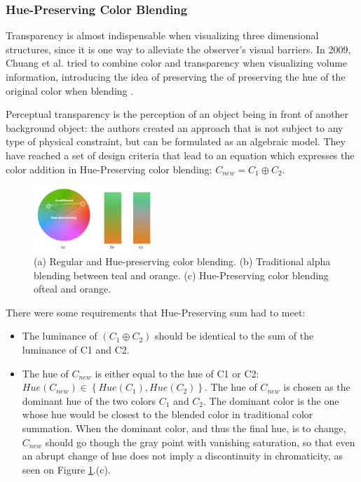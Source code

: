 \subsubsection{Hue-Preserving Color Blending}
%
Transparency is almost indispensable when visualizing three dimensional structures, since it is one way to
alleviate the observer’s visual barriers.
In 2009, Chuang et al. tried to combine color and transparency when visualizing volume information,
introducing the idea of preserving the of preserving the hue of the original color when blending \cite{Chuang2009}. \par
Perceptual transparency is the perception of an object being in front of another
background object: the authors created an approach that is not subject to any type of physical constraint, but can be
formulated as an algebraic model. They have reached a set of design criteria that lead
to an equation which expresses the color addition in Hue-Preserving color blending: $C_{new} = C_{1} \oplus C_{2}$. \par
%
\begin{figure}
	\centering
    \vspace{-10pt}
    \includegraphics[width=0.4\textwidth]{images/background/HuePreserving.png}
    \caption[Hue-Preserving Color Blending - Orange-Green Scale]{(a) Regular and
    Hue-preserving color blending. (b) Traditional alpha blending between teal and orange. (c) Hue-Preserving
    color blending ofteal and orange.
    \protect\cite{Chuang2009}}
    \label{fig:huepreserving1}
\end{figure}
%
There were some requirements that Hue-Preserving sum had to meet:
    \begin{itemize}
			\setlength\itemsep{0.01em}
    \item The luminance of $\left(C_{1} \oplus C_{2}\right)$ should be identical to the sum of the
    luminance of C1 and C2.
    \item The hue of $C_{new}$ is either equal to the hue of C1 or C2: $Hue(C_{new}) \in \left\{Hue(C_{1}),
    Hue(C_{2})\right\}$. The hue of $C_{new}$ is chosen as the dominant hue of the two colors $C_{1}$ and $C_{2}$. The
    dominant color is the one whose hue would be closest to the blended color in traditional color summation.
    When the dominant color, and thus the final hue, is to change, $C_{new}$ should go though the gray point
    with vanishing saturation, so that even an abrupt change of hue does not imply a discontinuity in
    chromaticity, as seen on Figure \ref{fig:huepreserving1}.(c).
    \end{itemize} \par
